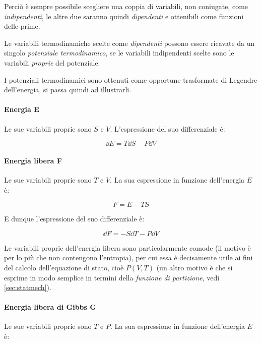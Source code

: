 Perciò è sempre possibile scegliere una coppia di variabili, non coniugate, come \textit{indipendenti}, le altre due saranno quindi \textit{dipendenti} e ottenibili come funzioni delle prime.
\newline

Le variabili termodinamiche scelte come \textit{dipendenti} possono essere ricavate da un singolo \textit{potenziale termodinamico}, se le variabili indipendenti scelte sono le variabili \textit{proprie} del potenziale.

I potenziali termodinamici sono ottenuti come opportune trasformate di Legendre dell'energia, si passa quindi ad illustrarli.

\paragraph{Energia E} Le sue variabili proprie sono $S$ e $V$. L'espressione del suo differenziale è:

\begin{equation*}
\dd E = T \dd S - P \dd V
\end{equation*}

\paragraph{Energia libera F} Le sue variabili proprie sono $T$ e $V$. La sua espressione in funzione dell'energia $E$ è:

\begin{equation*}
F = E - T S
\end{equation*}

E dunque l'espressione del suo differenziale è:

\begin{equation*}
\dd F = - S \dd T - P \dd V
\end{equation*}

\begin{note}
	Le variabili proprie dell'energia libera sono particolarmente comode (il motivo è per lo più che non contengono l'entropia), per cui essa è decisamente utile ai fini del calcolo dell'equazione di stato, cioè $ P(V,T) $ (un altro motivo è che si esprime in modo semplice in termini della \textit{funzione di partizione}, vedi \cref{sec:statmech}).
\end{note}

\paragraph{Energia libera di Gibbs G }Le sue variabili proprie sono $T$ e $P$. La sua espressione in funzione dell'energia $E$ è:

